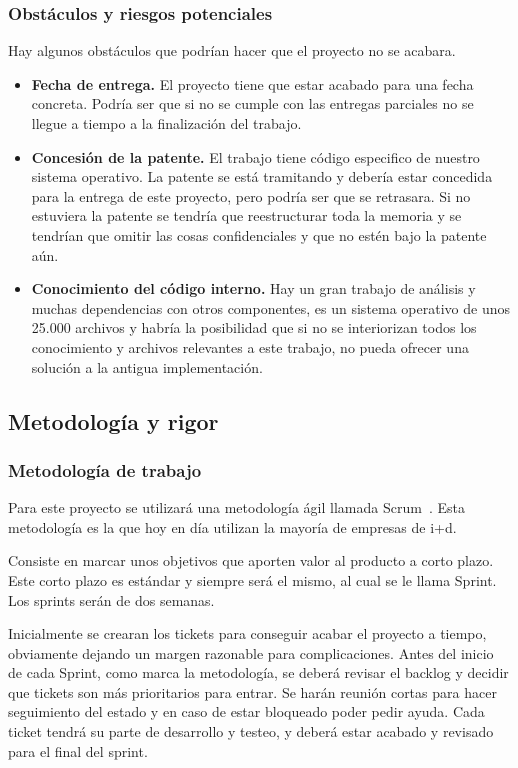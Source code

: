 \documentclass[12pt]{article}
\begin{document}
	\subsubsection{Obstáculos y riesgos potenciales}\label{sec:riesgos}
	Hay algunos obstáculos que podrían hacer que el proyecto no se acabara.
	\begin{itemize}
        \item \textbf{Fecha de entrega.} El proyecto tiene que estar acabado para una fecha concreta. Podría ser que si no se cumple con las entregas parciales no se llegue a tiempo a la finalización del trabajo.
        \item \textbf{Concesión de la patente.} El trabajo tiene código especifico de nuestro sistema operativo. La patente se está tramitando y debería estar concedida para la entrega de este proyecto, pero podría ser que se retrasara. Si no estuviera la patente se tendría que reestructurar toda la memoria y se tendrían que omitir las cosas confidenciales y que no estén bajo la patente aún.
        \item \textbf{Conocimiento del código interno.} Hay un gran trabajo de análisis y muchas dependencias con otros componentes, es un sistema operativo de unos 25.000 archivos y habría la posibilidad que si no se interiorizan todos los conocimiento y archivos relevantes a este trabajo, no pueda ofrecer una solución a la antigua implementación.
    \end{itemize}

    \subsection{Metodología y rigor}
    \subsubsection{Metodología de trabajo}
    Para este proyecto se utilizará una metodología ágil llamada Scrum~\cite{6}. Esta metodología es la que hoy en día utilizan la mayoría de empresas de i+d. 
    
    Consiste en marcar unos objetivos que aporten valor al producto a corto plazo. Este corto plazo es estándar y siempre será el mismo, al cual se le llama Sprint. Los sprints serán de dos semanas.
    
    \vspace{4mm}

    Inicialmente se crearan los tickets para conseguir acabar el proyecto a tiempo, obviamente dejando un margen razonable para complicaciones. Antes del inicio de cada Sprint, como marca la metodología, se deberá revisar el backlog y decidir que tickets son más prioritarios para entrar. Se harán reunión cortas para hacer seguimiento del estado y en caso de estar bloqueado poder pedir ayuda. 
    Cada ticket tendrá su parte de desarrollo y testeo, y deberá estar acabado y revisado para el final del sprint.
    
\end{document}
